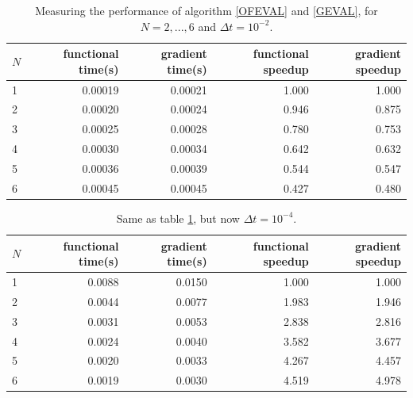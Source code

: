 \begin{table}[!h]
\centering
\caption{Measuring the performance of algorithm \ref{OFEVAL} and \ref{GEVAL}, for $N=2,...,6$ and $\Delta t=10^{-2}$.}
\label{Speed_table1}
\begin{tabular}{lrrrr}
\toprule
{}$N$ &  functional time(s) &  gradient time(s) &  functional speedup &  gradient speedup \\
\midrule
1 &           0.00019 &          0.00021 &            1.000 &          1.000 \\
2 &           0.00020 &          0.00024 &            0.946 &          0.875 \\
3 &           0.00025 &          0.00028 &            0.780 &          0.753 \\
4 &           0.00030 &          0.00034 &            0.642 &          0.632 \\
5 &           0.00036 &          0.00039 &            0.544 &          0.547 \\
6 &           0.00045 &          0.00045 &            0.427 &          0.480 \\
\bottomrule
\end{tabular}
\end{table}
\begin{table}[!h]
\centering
\caption{Same as table \ref{Speed_table1}, but now $\Delta t=10^{-4}$.}
\label{Speed_table2}
\begin{tabular}{lrrrr}
\toprule
{} $N$&  functional time(s) &  gradient time(s) &  functional speedup &  gradient speedup \\
\midrule
1 &           0.0088 &          0.0150 &            1.000 &          1.000 \\
2 &           0.0044 &          0.0077 &            1.983 &          1.946 \\
3 &           0.0031 &          0.0053 &            2.838 &          2.816 \\
4 &           0.0024 &          0.0040 &            3.582 &          3.677 \\
5 &           0.0020 &          0.0033 &            4.267 &          4.457 \\
6 &           0.0019 &          0.0030 &            4.519 &          4.978 \\
\bottomrule
\end{tabular}
\end{table}
